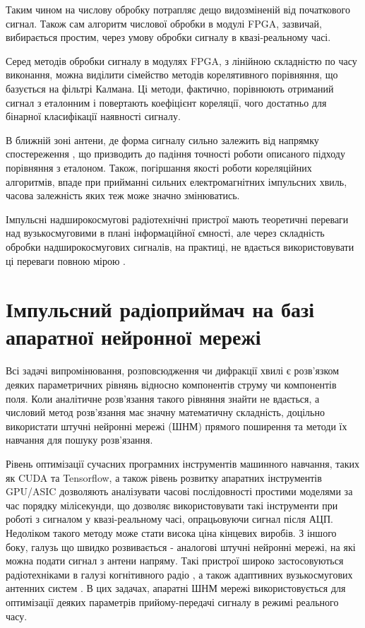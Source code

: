 Таким чином на числову обробку потрапляє дещо видозміненій від початкового
сигнал. Також сам алгоритм числової обробки в модулі FPGA, зазвичай,
вибирається простим, через умову обробки сигналу в квазі-реальному часі.

Серед методів обробки сигналу в модулях FPGA, з лінійною складністю по часу 
виконання, можна виділити сімейство методів корелятивного порівняння, що 
базується на фільтрі Калмана. Ці методи, фактично, порівнюють отриманий сигнал 
з еталонним і повертають коефіцієнт кореляції, чого достатньо для бінарної
класифікації наявності сигналу.

В ближній зоні антени, де форма сигналу сильно залежить від напрямку 
спостереження \cite{imp:Wu1985, imp:Sodin1992-10, my:Telecom2018}, що призводить 
до падіння точності роботи описаного підходу порівняння з еталоном. Також, 
погіршання якості роботи кореляційних алгоритмів, впаде при прийманні сильних 
електромагнітних імпульсних хвиль, часова залежність яких теж може значно 
змінюватись.

Імпульсні надширокосмугові радіотехнічні пристрої мають теоретичні переваги 
над вузькосмуговими в плані інформаційної ємності, але через складність 
обробки надширокосмугових сигналів, на практиці, не вдається використовувати 
ці переваги повною мірою \cite{imp:ChannelLimitations}.

\section{Імпульсний радіоприймач на базі апаратної нейронної мережі}

Всі задачі випромінювання, розповсюдження чи дифракції хвилі є розв'язком
деяких параметричних рівнянь відносно компонентів струму чи компонентів 
поля. Коли аналітичне розв'язання такого рівняння знайти не вдається, а 
числовий метод розв'язання має значну математичну складність, доцільно 
використати штучні нейронні мережі (ШНМ) прямого поширення та методи їх 
навчання для пошуку розв'язання.

Рівень оптимізації сучасних програмних інструментів машинного навчання, таких 
як CUDA та Tensorflow, а також рівень розвитку апаратних інструментів GPU/ASIC
дозволяють аналізувати часові послідовності простими моделями за час порядку 
мілісекунди, що дозволяє використовувати такі інструменти при роботі з 
сигналом у квазі-реальному часі, опрацьовуючи сигнал після АЦП. Недоліком 
такого методу може стати висока ціна кінцевих виробів. З іншого боку, галузь 
що швидко розвивається - аналогові штучні нейронні мережі, на які можна подати 
сигнал з антени напряму. Такі пристрої широко застосовуються радіотехніками
в галузі когнітивного радіо \cite{imp:Husseini2010}, а також адаптивних 
вузькосмугових антенних систем \cite{imp:Zbynek2002}. В цих задачах, 
апаратні ШНМ мережі використовується для оптимізації деяких параметрів 
прийому-передачі сигналу в режимі реального часу.

